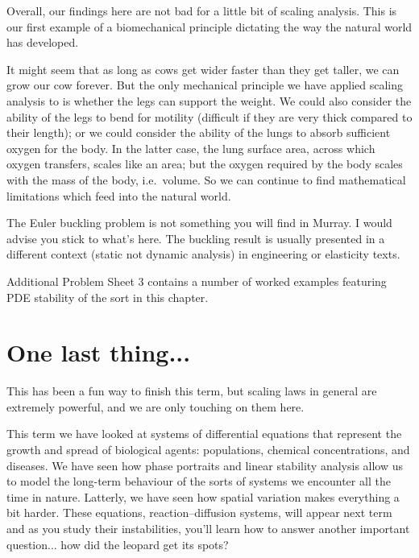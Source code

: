 \documentclass[main.tex]{subfiles}
\begin{document}
Overall, our findings here are not bad for a little bit of scaling analysis. This is our first example of a biomechanical principle dictating the way the natural world has developed. 

It might seem that as long as cows get wider faster than they get taller, we can grow our cow forever. But the only mechanical principle we have applied scaling analysis to is whether the legs can support the weight. We could also consider the ability of the legs to bend for motility (difficult if they are very thick compared to their length); or we could consider the ability of the lungs to absorb sufficient oxygen for the body. In the latter case, the lung surface area, across which oxygen transfers, scales like an area; but the oxygen required by the body scales with the mass of the body, i.e.\ volume. So we can continue to find mathematical limitations which feed into the natural world.

\vspace{0.5cm}
\begin{extra-reading}
The Euler buckling problem is not something you will find in Murray. I would advise you stick to what's here. The buckling result is usually presented in a different context (static not dynamic analysis) in engineering or elasticity texts.
\end{extra-reading}
\begin{do-it-yourself}
Additional Problem Sheet 3 contains a number of worked examples featuring PDE stability of the sort in this chapter.
\end{do-it-yourself}

\section*{One last thing...}
This has been a fun way to finish this term, but scaling laws in general are extremely powerful, and we are only touching on them here. 

This term we have looked at systems of differential equations that represent the growth and spread of biological agents: populations, chemical concentrations, and diseases. We have seen how phase portraits and linear stability analysis allow us to model the long-term behaviour of the sorts of systems we encounter all the time in nature. Latterly, we have seen how spatial variation makes everything a bit harder. These equations, reaction--diffusion systems, will appear next term and as you study their instabilities, you'll learn how to answer another important question... how did the leopard get its spots? 
\end{document}
